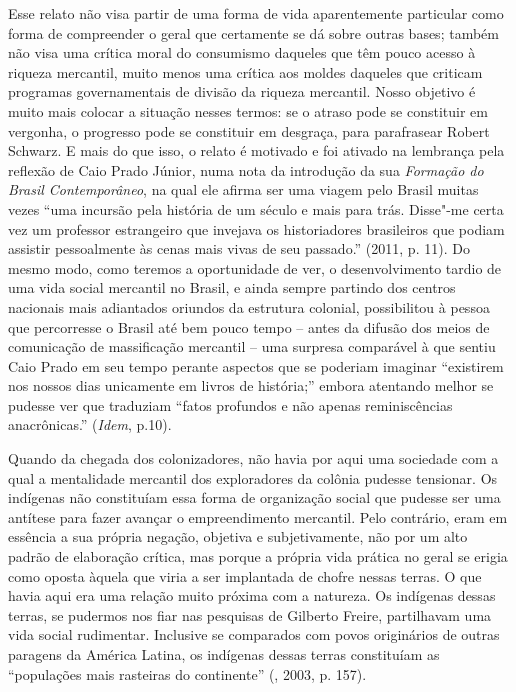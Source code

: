 {Esse relato não visa partir de uma forma de vida aparentemente
particular como forma de compreender o geral que certamente se dá sobre
outras bases; também não visa uma crítica moral do consumismo daqueles
que têm pouco acesso à riqueza mercantil, muito menos uma crítica aos
moldes daqueles que criticam programas governamentais de divisão da
riqueza mercantil. Nosso objetivo é muito mais colocar a situação nesses
termos: se o atraso pode se constituir em vergonha, o progresso pode se
constituir em desgraça, para parafrasear Robert Schwarz. E mais do que
isso, o relato é motivado e foi ativado na lembrança pela reflexão de
Caio Prado Júnior, numa nota da introdução da sua \emph{Formação do
Brasil Contemporâneo}, na qual ele afirma ser uma viagem pelo Brasil
muitas vezes ``uma incursão pela história de um século e mais para trás.
Disse"-me certa vez um professor estrangeiro que invejava os
historiadores brasileiros que podiam assistir pessoalmente às cenas mais
vivas de seu passado.'' (2011, p. 11). Do mesmo modo, como teremos a
oportunidade de ver, o desenvolvimento tardio de uma vida social
mercantil no Brasil, e ainda sempre partindo dos centros nacionais mais
adiantados oriundos da estrutura colonial, possibilitou à pessoa que
percorresse o Brasil até bem pouco tempo -- antes da difusão dos meios
de comunicação de massificação mercantil -- uma surpresa comparável à
que sentiu Caio Prado em seu tempo perante aspectos que se poderiam
imaginar ``existirem nos nossos dias unicamente em livros de história;''
embora atentando melhor se pudesse ver que traduziam ``fatos profundos e
não apenas reminiscências anacrônicas.'' (\emph{Idem}, p.10).

Quando da
chegada dos colonizadores, não havia por aqui uma sociedade com a qual a
mentalidade mercantil dos exploradores da colônia pudesse tensionar. Os
indígenas não constituíam essa forma de organização social que pudesse
ser uma antítese para fazer avançar o empreendimento mercantil. Pelo
contrário, eram em essência a sua própria negação, objetiva e
subjetivamente, não por um alto padrão de elaboração crítica, mas porque
a própria vida prática no geral se erigia como oposta àquela que viria a ser implantada
de chofre nessas terras. O que havia aqui era uma relação muito próxima
com a natureza. Os indígenas dessas terras, se pudermos nos fiar nas pesquisas de
Gilberto Freire, partilhavam uma vida social rudimentar. Inclusive se
comparados com povos originários de outras paragens da América Latina,
os indígenas dessas terras constituíam as ``populações mais rasteiras do
continente'' (, 2003, p. 157).

}
